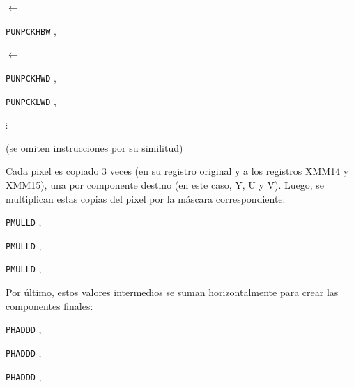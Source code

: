 \begin{center}

	 

	 

	 $\leftarrow$ 

	\texttt{PUNPCKHBW} ,  \hfill

	 

	 $\leftarrow$ 

	\texttt{PUNPCKHWD} ,  \hfill

	\texttt{PUNPCKLWD} ,  \hfill

	 

	 

	$\vdots$

	(se omiten instrucciones por su similitud)

	 

	 

\end{center}

Cada pixel es copiado 3 veces (en su registro original y a los registros XMM14 y XMM15), una por componente destino (en este caso, Y, U y V). Luego, se multiplican estas copias del pixel por la máscara correspondiente:

\begin{center}

	\texttt{PMULLD} ,  \hfill

	 

	\texttt{PMULLD} ,  \hfill

	 

	\texttt{PMULLD} ,  \hfill

	 
	
\end{center}

Por último, estos valores intermedios se suman horizontalmente para crear las componentes finales:

\begin{center}

	\texttt{PHADDD} ,  \hfill

	 

	\texttt{PHADDD} ,  \hfill

	 

	\texttt{PHADDD} ,  \hfill

	 

\end{center}

